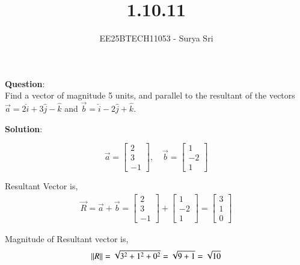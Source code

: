 \documentclass[journal]{IEEEtran}
\begin{document}

\vspace{3cm}

\title{1.10.11}
\author{EE25BTECH11053 - Surya Sri}
{\let\newpage\relax\maketitle}

\renewcommand{\thefigure}{\theenumi}
\renewcommand{\thetable}{\theenumi}
\setlength{\intextsep}{10pt} %

\textbf{Question}:\\
Find a vector of magnitude 5 units, and parallel to the resultant of the vectors $\vec{a} = 2\hat{i} + 3\hat{j} - \hat{k}$ and $\vec{b} = \hat{i} - 2\hat{j} + \hat{k}$.


\bigskip
\textbf{Solution}:

$$
\vec{a} = \begin{bmatrix} 2 \\ 3 \\ -1 \end{bmatrix}, \quad
\vec{b} = \begin{bmatrix} 1 \\ -2 \\ 1 \end{bmatrix}
$$

 Resultant Vector is,
\begin{align}
\vec{R} = \vec{a} + \vec{b} = 
\begin{bmatrix} 2 \\ 3 \\ -1 \end{bmatrix} + \begin{bmatrix} 1 \\ -2 \\ 1 \end{bmatrix}
= \begin{bmatrix} 3 \\ 1 \\ 0 \end{bmatrix}
\end{align}

Magnitude of Resultant vector is,
\begin{align}
\left\lVert R\right\rVert = \sqrt{3^2 + 1^2 + 0^2} = \sqrt{9 + 1} = \sqrt{10}
\end{align}
\end{document}
